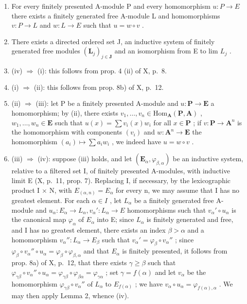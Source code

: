 \begin{enumerate}
\def\labelenumi{(\roman{enumi})}
\setcounter{enumi}{2}
\item
  For every finitely presented A-module P and every homomorphism \(u : P \to E\) there exists a finitely generated free A-module L and homomorphisms \(v : P \to L\) and \(w : L \to E\) such that \(u = w \circ v\) .
\item
  There exists a directed ordered set J, an inductive system of finitely generated free modules \((\mathbf{L}_{j})_{j\in\mathbf{J}}\) and an isomorphism from E to lim \(L_{j}\) .
\item
  (iv) \(\Rightarrow\) (i): this follows from prop. 4 (ii) of X, p.~8.
\item
  (i) \(\Rightarrow\) (ii): this follows from prop. 8b) of X, p.~12.
\item
  (ii) \(\Rightarrow\) (iii): let P be a finitely presented A-module and \(u: \mathbf{P} \to \mathbf{E}\) a homomorphism; by (ii), there exists \(v_1, \ldots, v_n \in \mathrm{Hom}_{\mathbf{A}}(\mathbf{P}, \mathbf{A})\) , \(w_1, \ldots, w_n \in \mathbf{E}\) such that \(u(x) = \sum v_i(x) w_i\) for all \(x \in \mathbf{P}\) ; if \(v: \mathbf{P} \to \mathbf{A}^n\) is the homomorphism with components \((v_i)\) and \(w: \mathbf{A}^n \to \mathbf{E}\) the homomorphism \((a_i) \mapsto \sum a_i w_i\) , we indeed have \(u = w \circ v\) .
\item
  (iii) \(\Rightarrow\) (iv): suppose (iii) holds, and let \((\mathbf{E}_{\alpha},\varphi_{\beta ,\alpha})\) be an inductive system, relative to a filtered set I, of finitely presented A-modules, with inductive limit E (X, p.~11, prop. 7). Replacing I, if necessary, by the lexicographic product I × N, with \(E_{(\alpha,n)} = E_{\alpha}\) for every n, we may assume that I has no greatest element. For each \(\alpha \in I\) , let \(L_{\alpha}\) be a finitely generated free A-module and \(u_{\alpha}: E_{\alpha} \to L_{\alpha}, v_{\alpha}': L_{\alpha} \to E\) homomorphisms such that \(v_{\alpha}' \circ u_{\alpha}\) is the canonical map \(\varphi_{\alpha}\) of \(E_{\alpha}\) into E; since \(L_{\alpha}\) is finitely generated and free, and I has no greatest element, there exists an index \(\beta > \alpha\) and a homomorphism \(v_{\alpha}'': L_{\alpha} \to E_{\beta}\) such that \(v_{\alpha}' = \varphi_{\beta} \circ v_{\alpha}''\) ; since \(\varphi_{\beta} \circ v_{\alpha}'' \circ u_{\alpha} = \varphi_{\beta} \circ \varphi_{\beta,\alpha}\) and that \(E_{\alpha}\) is finitely presented, it follows from prop. 8a) of X, p.~12, that there exists \(\gamma \geqslant \beta\) such that \(\varphi_{\gamma\beta} \circ v_{\alpha}'' \circ u_{\alpha} = \varphi_{\gamma\beta} \circ \varphi_{\beta\alpha} = \varphi_{\gamma\alpha}\) ; set \(\gamma = f(\alpha)\) and let \(v_{\alpha}\) be the homomorphism \(\varphi_{\gamma\beta} \circ v_{\alpha}''\) of \(L_{\alpha}\) to \(E_{f(\alpha)}\) ; we have \(v_{\alpha} \circ u_{\alpha} = \varphi_{f(\alpha),\alpha}\) . We may then apply Lemma 2, whence (iv).
\end{enumerate}

